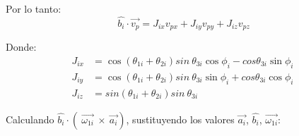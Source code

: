             Por lo tanto:
            \begin{equation}
                 \widehat{b_{i}} \cdot \overrightarrow{v_{p}} =J_{ix}v_{px}+J_{iy}v_{py}+J_{iz}v_{pz}
                                 \label{eq:jac_met_a_anex_5}
            \end{equation}
            
            Donde:
            \begin{align}
                  J_{ix}&=\cos  \left(  \theta _{1i}+ \theta _{2i} \right) sin~ \theta _{3i}\cos  \phi _{i}-cos  \theta _{3i}\sin  \phi _{i}~\\
                  J_{iy}&=\cos  \left(  \theta _{1i}+ \theta _{2i} \right) sin~ \theta _{3i}\sin  \phi _{i}+ cos  \theta _{3i}\cos  \phi _{i}~ \\
                  J_{iz}&=sin \left(  \theta _{1i}+ \theta _{2i} \right) sin~ \theta _{3i}~ 
                \end{align}
                
                Calculando $\widehat{b_{i}} \cdot  \left( ~\overrightarrow{ \omega _{1i}}~\times~\overrightarrow{a_{i}} \right)$, sustituyendo los valores $\overrightarrow{a_{i}}$, $\widehat{b_{i}}$, $\overrightarrow{ \omega _{1i}}$:
                

